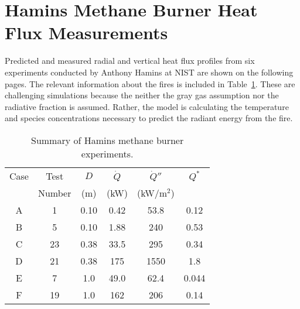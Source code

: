 \clearpage

\section{Hamins Methane Burner Heat Flux Measurements}

Predicted and measured radial and vertical heat flux profiles from six experiments conducted by Anthony Hamins at NIST are shown on the following pages. The
relevant information about the fires is included in Table~\ref{Hamins_Table}. These are challenging simulations because the neither the gray gas assumption
nor the radiative fraction is assumed. Rather, the model is calculating the temperature and species concentrations necessary to predict the radiant energy from the fire.

\begin{table}[ht]
\caption{Summary of Hamins methane burner experiments. }
\begin{center}
\begin{tabular}{|c|c|c|c|c|c|}
\hline
Case     & Test     & $D$  & $\dot{Q}$   &  $\dot{Q}''$   & $Q^*$   \\
         & Number   & (m)  & (kW)        &  (kW/m$^2$)    &         \\ \hline \hline
A        & 1        & 0.10 & 0.42        &  53.8          & 0.12    \\ \hline
B        & 5        & 0.10 & 1.88        &  240           & 0.53    \\ \hline
C        & 23       & 0.38 & 33.5        &  295           & 0.34    \\ \hline
D        & 21       & 0.38 & 175         &  1550          & 1.8     \\ \hline
E        & 7        & 1.0  & 49.0        &  62.4          & 0.044   \\ \hline
F        & 19       & 1.0  & 162         &  206           & 0.14    \\ \hline
\end{tabular}
\end{center}
\label{Hamins_Table}
\end{table}

\newpage

